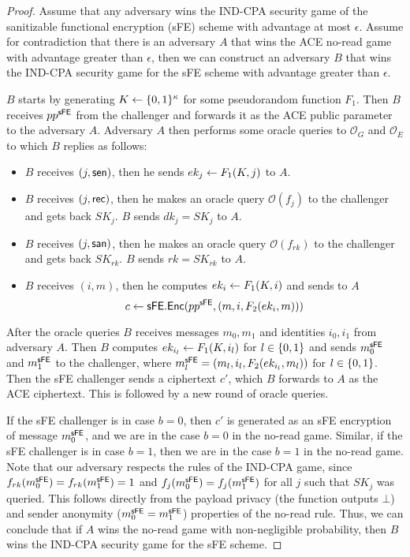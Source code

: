 \documentclass{llncs}
\begin{document}
\begin{proof}
Assume that any adversary wins the IND-CPA security game of the sanitizable functional encryption (sFE) scheme with advantage at most $\epsilon$.
Assume for contradiction that there is an adversary $A$ that wins the ACE no-read game with advantage greater than $\epsilon$, then we can construct an adversary $B$ that wins the IND-CPA security game for the sFE scheme with advantage greater than $\epsilon$.

$B$ starts by generating $K \leftarrow \{0,1\}^\kappa$ for some pseudorandom function $F_1$. Then $B$ receives $pp^{\mathsf{sFE}}$ from the challenger and forwards it as the ACE public parameter to the adversary $A$. 
Adversary $A$ then performs some oracle queries to $\mathcal{O}_G$ and $\mathcal{O}_E$ to which $B$ replies as follows: 
\begin{itemize}
\item $B$ receives $(j,\mathsf{sen})$, then he sends $ek_j \leftarrow F_1(K,j)$ to $A$.
\item $B$ receives $(j,\mathsf{rec})$, then he makes an oracle query $\mathcal{O}(f_j)$ to the challenger and gets back $SK_j$. $B$ sends $dk_j = SK_j$ to $A$.
\item $B$ receives $(j,\mathsf{san})$, then he makes an oracle query $\mathcal{O}(f_{rk})$ to the challenger and gets back $SK_{rk}$. $B$ sends $rk = SK_{rk}$ to $A$.
\item $B$ receives $(i,m)$, then he computes $ek_i \leftarrow F_1(K,i)$ and sends to $A$ $$c \leftarrow \mathsf{sFE}.\mathsf{Enc}(pp^{\mathsf{sFE}},(m,i,F_{2}(ek_i,m)))$$
\end{itemize}
After the oracle queries $B$ receives messages $m_0,m_1$ and identities $i_0,i_1$ from adversary $A$. Then $B$ computes $ek_{i_l} \leftarrow F_1(K,i_l)$ for $l \in \{0,1\}$ and sends $m_0^{\mathsf{sFE}}$ and $m_1^{\mathsf{sFE}}$ to the challenger, where $m_l^{\mathsf{sFE}} = (m_l,i_l,F_{2}(ek_{i_l},m_l))$ for $l \in \{0,1\}$.
Then the sFE challenger sends a ciphertext $c'$, which $B$ forwards to $A$ as the ACE ciphertext. 
This is followed by a new round of oracle queries.

If the sFE challenger is in case $b=0$, then $c'$ is generated as an sFE encryption of message $m_0^{\mathsf{sFE}}$, and we are in the case $b=0$ in the no-read game. Similar, if the sFE challenger is in case $b=1$, then we are in the case $b=1$ in the no-read game. Note that our adversary respects the rules of the IND-CPA game, since $f_{rk}(m_0^{\mathsf{sFE}})=f_{rk}(m_1^{\mathsf{sFE}})=1$ and $f_{j}(m_0^{\mathsf{sFE}})=f_{j}(m_1^{\mathsf{sFE}})$ for all $j$ such that $SK_j$ was queried. This follows directly from the payload privacy (the function outputs $\bot$) and sender anonymity ($m_0^{\mathsf{sFE}}=m_1^{\mathsf{sFE}}$) properties of the no-read rule.
Thus, we can conclude that if $A$ wins the no-read game with non-negligible probability, then $B$ wins the IND-CPA security game for the sFE scheme.
\end{proof}
\end{document}
